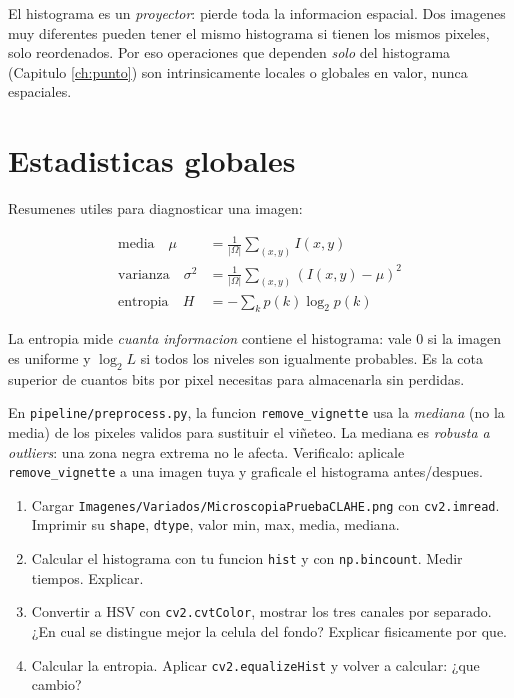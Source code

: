 \documentclass[11pt,a4paper,twoside,openright]{book}
\begin{document}
\begin{intuibox}
El histograma es un \emph{proyector}: pierde toda la informacion espacial. Dos imagenes muy diferentes pueden tener el mismo histograma si tienen los mismos pixeles, solo reordenados. Por eso operaciones que dependen \emph{solo} del histograma (Capitulo \ref{ch:punto}) son intrinsicamente locales o globales en valor, nunca espaciales.
\end{intuibox}

\section{Estadisticas globales}

Resumenes utiles para diagnosticar una imagen:

\begin{align}
\text{media} \quad \mu &= \frac{1}{|\Omega|}\sum_{(x,y)} I(x,y) \\
\text{varianza} \quad \sigma^2 &= \frac{1}{|\Omega|}\sum_{(x,y)} (I(x,y)-\mu)^2 \\
\text{entropia} \quad H &= -\sum_{k} p(k)\log_2 p(k)
\end{align}

La entropia mide \emph{cuanta informacion} contiene el histograma: vale $0$ si la imagen es uniforme y $\log_2 L$ si todos los niveles son igualmente probables. Es la cota superior de cuantos bits por pixel necesitas para almacenarla sin perdidas.

\begin{pipeline}
En \texttt{pipeline/preprocess.py}, la funcion \texttt{remove\_vignette} usa la \emph{mediana} (no la media) de los pixeles validos para sustituir el viñeteo. La mediana es \emph{robusta a outliers}: una zona negra extrema no le afecta. Verificalo: aplicale \texttt{remove\_vignette} a una imagen tuya y graficale el histograma antes/despues.
\end{pipeline}

\begin{ejercicio}
\begin{enumerate}[leftmargin=2em]
  \item Cargar \texttt{Imagenes/Variados/MicroscopiaPruebaCLAHE.png} con \texttt{cv2.imread}. Imprimir su \texttt{shape}, \texttt{dtype}, valor min, max, media, mediana.
  \item Calcular el histograma con tu funcion \texttt{hist} y con \texttt{np.bincount}. Medir tiempos. Explicar.
  \item Convertir a HSV con \texttt{cv2.cvtColor}, mostrar los tres canales por separado. ¿En cual se distingue mejor la celula del fondo? Explicar fisicamente por que.
  \item Calcular la entropia. Aplicar \texttt{cv2.equalizeHist} y volver a calcular: ¿que cambio?
\end{enumerate}
\end{ejercicio}
\end{document}
